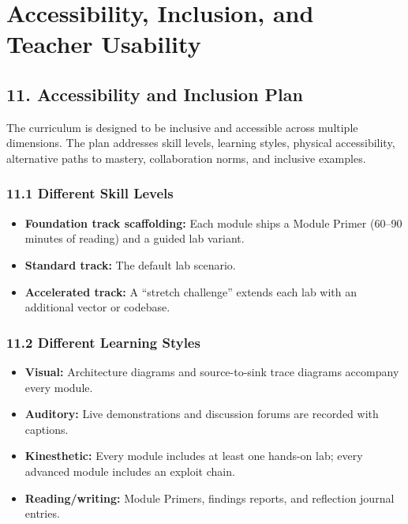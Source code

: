 \documentclass[11pt,letterpaper,oneside]{report}
\begin{document}
\chapter*{Accessibility, Inclusion, and Teacher Usability}

\section*{11. Accessibility and Inclusion Plan}
The curriculum is designed to be inclusive and accessible across multiple dimensions. The plan addresses skill levels, learning styles, physical accessibility, alternative paths to mastery, collaboration norms, and inclusive examples.

\subsection*{11.1 Different Skill Levels}
\begin{itemize}
  \item \textbf{Foundation track scaffolding:} Each module ships a Module Primer (60--90 minutes of reading) and a guided lab variant.
  \item \textbf{Standard track:} The default lab scenario.
  \item \textbf{Accelerated track:} A ``stretch challenge'' extends each lab with an additional vector or codebase.
\end{itemize}

\subsection*{11.2 Different Learning Styles}
\begin{itemize}
  \item \textbf{Visual:} Architecture diagrams and source-to-sink trace diagrams accompany every module.
  \item \textbf{Auditory:} Live demonstrations and discussion forums are recorded with captions.
  \item \textbf{Kinesthetic:} Every module includes at least one hands-on lab; every advanced module includes an exploit chain.
  \item \textbf{Reading/writing:} Module Primers, findings reports, and reflection journal entries.
\end{itemize}
\end{document}

